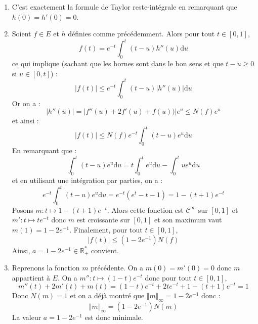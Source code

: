 \documentclass[a4paper,10pt]{report}
\begin{document}
\begin{enumerate}
\item 
C'est exactement la formule de Taylor reste-intégrale en remarquant que $h(0)=h'(0)=0$.
\item Soient $f \in E$ et $h$ définies comme précédemment. Alors pour tout $t \in [0,1]$,
$$ f(t) = e^{-t} \int_{0}^t (t-u) h''(u) \textrm{d}u$$
ce qui implique (sachant que les bornes sont dans le bon sens et que $t-u \geq 0$ si $u \in [0,t]$) :
$$  \vert f(t) \vert \leq e^{-t} \int_{0}^t (t-u) \vert h''(u) \vert  \textrm{d}u$$
Or on a :
$$ \vert h''(u) \vert = \vert f''(u)+2f'(u)+f(u)) \vert e^u \leq N(f) e^u$$
et ainsi :
$$ \vert f(t) \vert \leq  N(f) e^{-t} \int_{0}^t (t-u) e^u\textrm{d}u$$
En remarquant que :
$$ \int_{0}^t (t-u) e^u\textrm{d}u = t \int_{0}^t e^u \textrm{d}u - \int_{0}^t u e^u \textrm{d}u$$
et en utilisant une intégration par parties, on a :
$$  e^{-t} \int_{0}^t (t-u) e^u\textrm{d}u = e^{-t}(e^t-t-1) = 1 -(t+1)e^{-t}$$
Posons $m : t \mapsto 1-(t+1)e^{-t}$. Alors cette fonction est $\mathcal{C}^{\infty}$ sur $[0,1]$ et $m' : t \mapsto t e^{-t}$ donc $m$ est croissante sur $[0,1]$ et son maximum vaut $m(1)= 1-2e^{-1}$. Finalement, pour tout $t \in [0,1]$,
$$ \vert f(t) \vert \leq (1-2e^{-1}) N(f) $$
Ainsi, $a = 1-2e^{-1} \in \mathbb{R}_+^{*}$ convient.
\item Reprenons la fonction $m$ précédente. On a $m(0)=m'(0)=0$ donc $m$ appartient à $E$. On a $m'' : t \mapsto (1-t)e^{-t}$ donc pour tout $t \in [0,1]$,
$$ m''(t)+2m'(t)+m(t) = (1-t)e^{-t} +2t e^{-t} +1 -(t+1)e^{-t} = 1$$
Donc $N(m) =1$ et on a déjà montré que $\Vert m \Vert_{\infty}=1-2 e^{-1}$ donc :
$$ \Vert m \Vert_{\infty}=(1-2 e^{-1}) N(m)$$
La valeur $a = 1-2e^{-1}$ est donc minimale.
\end{enumerate}
\end{document}
